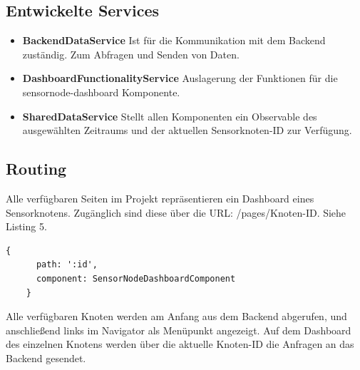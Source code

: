 \subsection{Entwickelte Services}

\begin{itemize}
 \item \textbf{BackendDataService} Ist für die Kommunikation mit dem Backend zuständig. Zum Abfragen und Senden von Daten.
 \item \textbf{DashboardFunctionalityService} Auslagerung der Funktionen für die sensornode-dashboard Komponente.
 \item \textbf{SharedDataService} Stellt allen Komponenten ein Observable des ausgewählten Zeitraums und der aktuellen Sensorknoten-ID zur Verfügung.
\end{itemize}
\subsection{Routing}
Alle verfügbaren Seiten im Projekt repräsentieren ein Dashboard eines Sensorknotens.
Zugänglich sind diese über die URL: /pages/{Knoten-ID}. Siehe Listing 5.
\begin{lstlisting}[caption={Knoten-ID Routing},captionpos=b,showstringspaces=false, basicstyle=\small]
    {
      path: ':id',
      component: SensorNodeDashboardComponent
    }
\end{lstlisting}
Alle verfügbaren Knoten werden am Anfang aus dem Backend abgerufen, und anschließend links im Navigator als Menüpunkt angezeigt. Auf dem Dashboard des einzelnen Knotens werden über die aktuelle Knoten-ID die Anfragen an das Backend gesendet.
